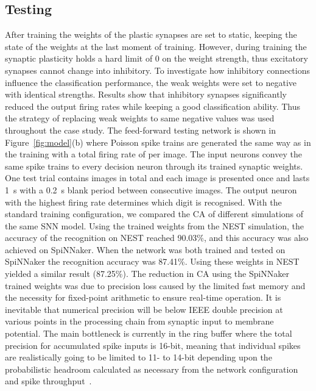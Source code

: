 \subsection{Testing}
After training the weights of the plastic synapses are set to static, keeping the state of the weights at the last moment of training.
However, during training the synaptic plasticity holds a hard limit of 0 on the weight strength, thus excitatory synapses cannot change into inhibitory.
To investigate how inhibitory connections influence the classification performance, the weak weights were set to negative with identical strengths.
Results show that inhibitory synapses significantly reduced the output firing rates while keeping a good classification ability.
Thus the strategy of replacing weak weights to \protect{} same negative values was used throughout the case study.
The feed-forward testing network is shown in Figure~\ref{fig:model}(b) where Poisson spike trains are generated the same way as in the training with a total firing rate of \protect{} \protect{} per image.
The input neurons convey the same spike trains to every decision neuron through its \protect{} \protect{} trained synaptic weights. 
One test trial contains \protect{} \protect{} images in total and each image is presented once and lasts 1~s with a 0.2~s blank period between consecutive images.
The output neuron with the highest firing rate determines which digit is recognised.
With the standard training configuration, we compared the CA of different simulations of the same SNN model.
Using the trained weights from the NEST simulation, the accuracy of the recognition on NEST reached 90.03\%, and this accuracy was also achieved on SpiNNaker.
When the network was both trained and tested on SpiNNaker the recognition accuracy was 87.41\%.
Using these weights in NEST yielded a similar result (87.25\%). 
The reduction in CA using the SpiNNaker trained weights was due to precision loss caused by the limited fast memory and the necessity for fixed-point arithmetic to ensure real-time operation.
It is inevitable that numerical precision will be below IEEE double precision at various points in the processing chain from synaptic input to membrane potential.
The main bottleneck is currently in the ring buffer where the total precision for accumulated spike inputs is 16-bit, meaning that individual spikes are realistically going to be limited to 11- to 14-bit depending upon the probabilistic headroom calculated as necessary from the network configuration and spike throughput~\citep{Hopkins2015Accuracy}.


